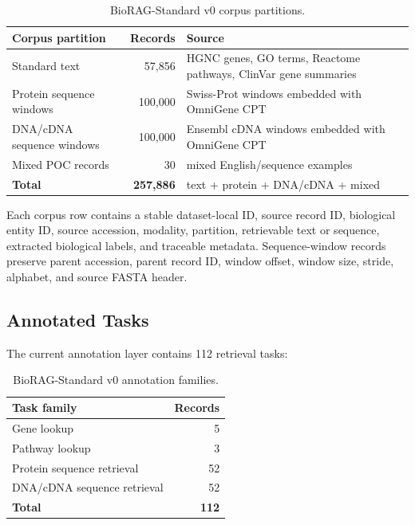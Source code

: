 \documentclass[11pt]{article}
\begin{document}
\begin{table}[t]
\centering
\caption{BioRAG-Standard v0 corpus partitions.}
\label{tab:corpus}
\small
\begin{tabularx}{\textwidth}{l r X}
\toprule
Corpus partition & Records & Source \\
\midrule
Standard text & 57,856 & HGNC genes, GO terms, Reactome pathways, ClinVar gene summaries \\
Protein sequence windows & 100,000 & Swiss-Prot windows embedded with OmniGene CPT \\
DNA/cDNA sequence windows & 100,000 & Ensembl cDNA windows embedded with OmniGene CPT \\
Mixed POC records & 30 & mixed English/sequence examples \\
\midrule
\textbf{Total} & \textbf{257,886} & text + protein + DNA/cDNA + mixed \\
\bottomrule
\end{tabularx}
\end{table}

Each corpus row contains a stable dataset-local ID, source record ID, biological entity ID, source accession, modality, partition, retrievable text or sequence, extracted biological labels, and traceable metadata. Sequence-window records preserve parent accession, parent record ID, window offset, window size, stride, alphabet, and source FASTA header.

\subsection{Annotated Tasks}

The current annotation layer contains 112 retrieval tasks:

\begin{table}[t]
\centering
\caption{BioRAG-Standard v0 annotation families.}
\label{tab:tasks}
\begin{tabular}{lr}
\toprule
Task family & Records \\
\midrule
Gene lookup & 5 \\
Pathway lookup & 3 \\
Protein sequence retrieval & 52 \\
DNA/cDNA sequence retrieval & 52 \\
\midrule
\textbf{Total} & \textbf{112} \\
\bottomrule
\end{tabular}
\end{table}
\end{document}
